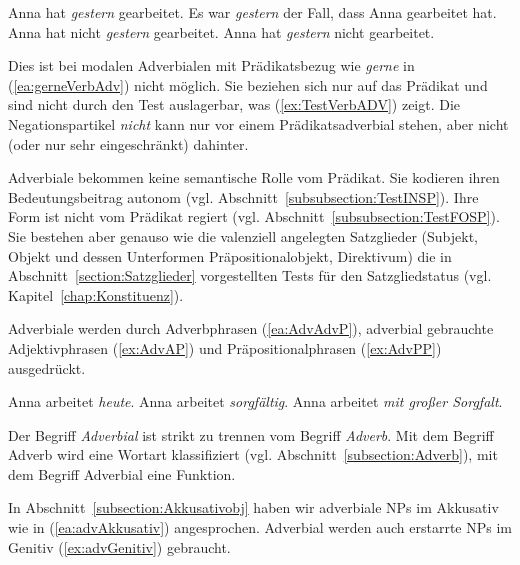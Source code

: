 \ea \label{ea:Satzadverbial}
\ea \label{ea:gesternSatzADV} Anna hat \textit{gestern} gearbeitet.
\ex \label{ex:TestSatzADV} Es war \textit{gestern} der Fall, dass Anna gearbeitet hat.
\ex \label{ex:nicht gestern} Anna hat nicht \textit{gestern} gearbeitet.
\ex \label{ex:gestern nicht} Anna hat \textit{gestern} nicht gearbeitet.
\z 
\z 

Dies ist bei modalen Adverbialen mit Prädikatsbezug wie \textit{gerne} in (\ref{ea:gerneVerbAdv}) nicht möglich. Sie beziehen sich nur auf das Prädikat und sind nicht durch den Test auslagerbar, was (\ref{ex:TestVerbADV}) zeigt. Die Negationspartikel \textit{nicht} kann nur vor einem Prädikatsadverbial stehen, aber nicht (oder nur sehr eingeschränkt) dahinter.

\largerpage[-1]
\ea \label{ea:VerbADV}
\label{ea:gerneVerbAdv}
\label{ex:TestVerbADV}
\label{ex:nicht gerne}
\label{ex:gerne nicht}
\z 
\z


Adverbiale bekommen keine semantische Rolle vom Prädikat. Sie kodieren ihren Bedeutungsbeitrag autonom (vgl. Abschnitt~\ref{subsubsection:TestINSP}). Ihre Form ist nicht vom Prädikat regiert (vgl. Abschnitt~\ref{subsubsection:TestFOSP}). Sie bestehen aber genauso wie die valenziell angelegten Satzglieder (Subjekt, Objekt und dessen Unterformen Präpositionalobjekt, Direktivum) die in Abschnitt~\ref{section:Satzglieder} vorgestellten Tests für den Satzgliedstatus (vgl. Kapitel~\ref{chap:Konstituenz}). 

Adverbiale werden durch Adverbphrasen (\ref{ea:AdvAdvP}), adverbial gebrauchte Adjektivphrasen (\ref{ex:AdvAP}) und Präpositionalphrasen (\ref{ex:AdvPP}) ausgedrückt.  

\ea \label{ea:originäre AdverbialXP}
\ea \label{ea:AdvAdvP} Anna arbeitet \textit{heute}.
\ex \label{ex:AdvAP} Anna arbeitet \textit{sorgfältig}.
\ex \label{ex:AdvPP} Anna arbeitet \textit{mit großer Sorgfalt}.
\z 
\z 

Der Begriff \textit{Adverbial} ist strikt zu trennen vom Begriff \textit{Adverb}. Mit dem Begriff Adverb wird eine Wortart klassifiziert (vgl. Abschnitt~\ref{subsection:Adverb}), mit dem Begriff Adverbial eine Funktion.

In Abschnitt~\ref{subsection:Akkusativobj} haben wir adverbiale NPs im Akkusativ wie in (\ref{ea:advAkkusativ}) angesprochen. Adverbial werden auch erstarrte NPs im Genitiv (\ref{ex:advGenitiv}) gebraucht.

